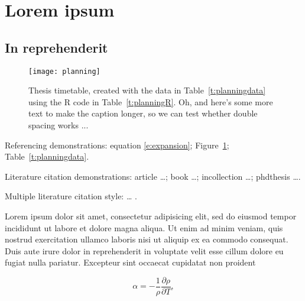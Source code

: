 \documentclass{thesis_proposal}
\begin{document}
\mainmatter                     %

%

\section{Lorem ipsum}

\subsection{In reprehenderit}

\begin{figure}[t]
  \begin{center}
    \texttt{[image: planning]} %
  \end{center}
  \caption[Research timetable.]{\label{f:planning}Thesis timetable, created
  with the data in Table~\ref{t:planningdata} using the R code in Table~\ref{t:planningR}. Oh, and here's some more text to make the caption longer, so we can test whether double spacing works ...}
\end{figure}

Referencing demonstrations:
equation \eqref{e:expansion};
Figure~\ref{f:planning};
Table~\ref{t:planningdata}.

Literature citation demonstrations:
article \cite{Voss:2001} \dots \cite[]{Voss:2001};
book \cite{JeffreysJeffreys1972}  \dots \cite[]{JeffreysJeffreys1972};
incollection \cite{Marshall1985}  \dots\cite[]{Marshall1985};
phdthesis \cite{Michel:1974} \dots \cite[]{Michel:1974}.

Multiple literature citation style:
\cite{Voss:2001,Jahnke:1990} \dots
\cite[]{Voss:2001,Jahnke:1990}.

Lorem ipsum dolor sit amet, consectetur adipisicing elit, sed do
eiusmod tempor incididunt ut labore et dolore magna aliqua. Ut enim ad
minim veniam, quis nostrud exercitation ullamco laboris nisi ut
aliquip ex ea commodo consequat. Duis aute irure dolor in
reprehenderit in voluptate velit esse cillum dolore eu fugiat nulla
pariatur. Excepteur sint occaecat cupidatat non proident

\begin{equation}
  \label{e:expansion}
  \alpha = -\frac{1}{\rho}\frac{\partial \rho}{\partial T},
\end{equation}
\end{document}
